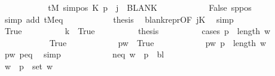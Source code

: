 \begin{isabellebody}
\ \ \ \ \ \ \ \ \isamarkupfalse%
\ \isamarkupfalse%
\ {\isachardoublequoteopen}{\isacharquery}{\kern0pt}tM{\isacharprime}{\kern0pt}\ {\isacharparenleft}{\kern0pt}sim{\isacharunderscore}{\kern0pt}pos\ {\isacharquery}{\kern0pt}K\ p\ {\isacharplus}{\kern0pt}\ j{\isacharparenright}{\kern0pt}\ {\isacharequal}{\kern0pt}\ BLANK{}{\isachardoublequoteclose}\isanewline
\ \ \ \ \ \ \ \ \ \ \isamarkupfalse%
\ False\ sppos\ \isamarkupfalse%
\ {\isacharparenleft}{\kern0pt}simp\ add{\isacharcolon}{\kern0pt}\ tM{\isacharprime}{\kern0pt}{\isacharunderscore}{\kern0pt}eq{\isacharparenright}{\kern0pt}\isanewline
\ \ \ \ \ \ \ \ \isamarkupfalse%
\ \isamarkupfalse%
\ {\isacharquery}{\kern0pt}thesis\ \isamarkupfalse%
\ blank{\isacharunderscore}{\kern0pt}repr{\isacharbrackleft}{\kern0pt}OF\ jK{\isacharbrackright}{\kern0pt}\ \isamarkupfalse%
\ simp\isanewline
\ \ \ \ \ \ \isamarkupfalse%
\isanewline
\ \ \ \ \ \ \ \ \isamarkupfalse%
\ True\isanewline
\ \ \ \ \ \ \ \ \isamarkupfalse%
\ k{}\ {\isacharequal}{\kern0pt}\ True\isanewline
\ \ \ \ \ \ \ \ \isamarkupfalse%
\ {\isacharquery}{\kern0pt}thesis\isanewline
\ \ \ \ \ \ \ \ \isamarkupfalse%
\ {\isacharparenleft}{\kern0pt}cases\ {\isachardoublequoteopen}p\ {\isasymle}\ length\ w{\isachardoublequoteclose}{\isacharparenright}{\kern0pt}\isanewline
\ \ \ \ \ \ \ \ \ \ \isamarkupfalse%
\ True\isanewline
\ \ \ \ \ \ \ \ \ \ \isamarkupfalse%
\ pw\ {\isacharequal}{\kern0pt}\ True\isanewline
\ \ \ \ \ \ \ \ \ \ \isamarkupfalse%
\ p{}w{\isacharcolon}{\kern0pt}\ {\isachardoublequoteopen}p{}\ {\isacharless}{\kern0pt}\ length\ w{\isachardoublequoteclose}\ \isamarkupfalse%
\ pw\ p{\isacharunderscore}{\kern0pt}eq\ \isamarkupfalse%
\ simp\isanewline
\ \ \ \ \ \ \ \ \ \ \isamarkupfalse%
\ neq{\isacharcolon}{\kern0pt}\ {\isachardoublequoteopen}w\ {\isacharbang}{\kern0pt}\ p{}\ {\isasymnoteq}\ {\isacharquery}{\kern0pt}bl{\isachardoublequoteclose}\isanewline
\ \ \ \ \ \ \ \ \ \ \isamarkupfalse%
\ {\isacharminus}{\kern0pt}\isanewline
\ \ \ \ \ \ \ \ \ \ \ \ \isamarkupfalse%
\ {\isachardoublequoteopen}w\ {\isacharbang}{\kern0pt}\ p{}\ {\isasymin}\ set\ w{\isachardoublequoteclose}\ \isamarkupfalse%

\end{isabellebody}
